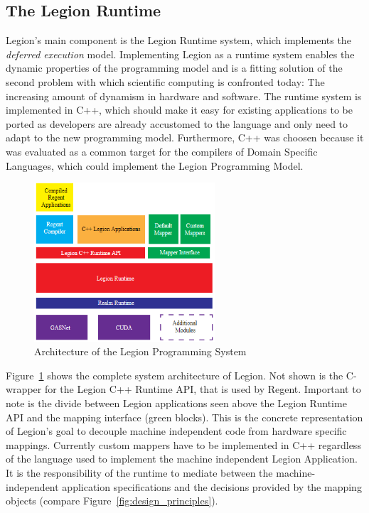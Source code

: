 \documentclass{article}      %
\begin{document}
\subsection{The Legion Runtime}
Legion's main component is the Legion Runtime system, which implements the \emph{deferred execution} model. Implementing Legion as a runtime system enables the dynamic properties of the programming model and is a fitting solution of the second problem with which scientific computing is confronted today: The increasing amount of dynamism in hardware and software. The runtime system is implemented in C++, which should make it easy for existing applications to be ported as developers are already accustomed to the language and only need to adapt to the new programming model. Furthermore, C++ was choosen because it was evaluated as a common target for the compilers of Domain Specific Languages, which could implement the Legion Programming Model.
\begin{figure}[H]
	\centering
	\includegraphics[width=0.6\textwidth]{images/system_architecture}
	\caption[Caption for LOF]{Architecture of the Legion Programming System\footnotemark}\label{fig:syste_arch}
\end{figure}


Figure~\hyperref[fig:syste_arch]{\ref{fig:syste_arch}} shows the complete system architecture of Legion. Not shown is the C-wrapper for the Legion C++ Runtime API, that is used by Regent.
 Important to note is the divide between Legion applications seen above the Legion Runtime API and the mapping interface (green blocks). 
This is the concrete representation of Legion's goal to decouple machine independent code from hardware specific mappings. Currently custom mappers have to be implemented in C++ regardless of the language used to implement the machine independent Legion Application. 
It is the responsibility of the runtime to mediate between the machine-independent application specifications and the decisions provided by the mapping objects (compare Figure~\hyperref[fig:design_principles]{\ref{fig:design_principles}}).
\end{document}
